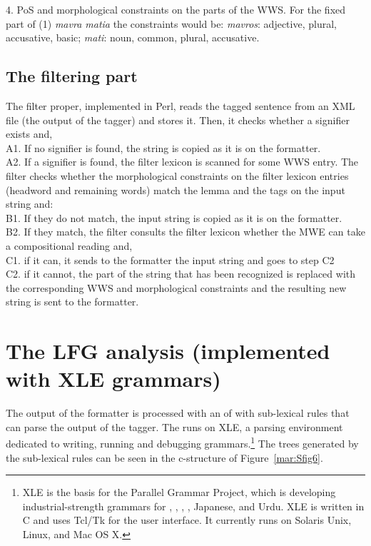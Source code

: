 \documentclass[output=paper]{langsci/langscibook}
\begin{document}
4. PoS and morphological constraints on the parts of the WWS. For the fixed part of (1) \textit{mavra matia} the constraints would be: \textit{mavros}: adjective, plural, accusative, basic; \textit{mati}: noun, common, plural, accusative. 

\subsection{The filtering part}
The filter proper, implemented in Perl, reads the tagged sentence from an \textsc{XML} file (the output of the tagger) and stores it. Then, it checks whether a signifier exists and, \\
A1. If no signifier is found, the string is copied as it is on the formatter. \\
A2. If a signifier is found, the filter lexicon is scanned for some WWS entry. The filter checks whether the morphological constraints on the filter lexicon entries (headword and remaining words) match the lemma and the tags on the input string and:\\
B1. If they do not match, the input string is copied as it is on the formatter.\\
B2. If they match, the filter consults the filter lexicon whether the MWE can take a compositional reading and, \\
C1. if it can, it sends to the formatter the input string and goes to step C2\\
C2. if it cannot, the part of the string that has been recognized is replaced with the corresponding WWS and morphological constraints and the resulting new string is sent to the formatter.\\

\section{The LFG analysis (implemented with XLE grammars)}
The output of the formatter is processed with an   of  with sub-lexical rules that can parse the output of the tagger. The  runs on XLE, a parsing environment dedicated to writing, running and debugging  grammars.\footnote{XLE is the basis for the Parallel Grammar Project, which is developing industrial-strength grammars for , , , , Japanese, and Urdu. XLE is written in C and uses Tcl/Tk for the user interface. It currently runs on Solaris Unix, Linux, and Mac OS X.} The trees generated by the sub-lexical rules can be seen in the c-structure of Figure~\ref{mar:Sfig6}. 
\end{document}

